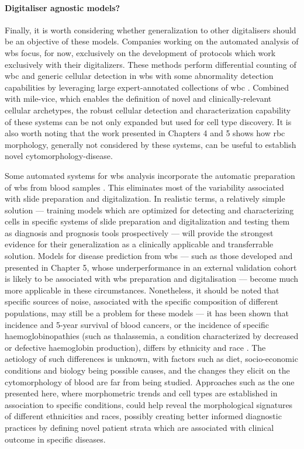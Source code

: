 \paragraph{Digitaliser agnostic models?} Finally, it is worth considering whether generalization to other digitalisers should be an objective of these models. Companies working on the automated analysis of \ac{wbs} focus, for now, exclusively on the development of protocols which work exclusively with their digitalizers. These methods perform differential counting of \ac{wbc} and generic cellular detection in \ac{wbs} with some abnormality detection capabilities by leveraging large expert-annotated collections of \ac{wbc} \cite{cellavision,advia-120}. Combined with \ac{mile-vice}, which enables the definition of novel and clinically-relevant cellular archetypes, the robust cellular detection and characterization capability of these systems can be not only expanded but used for cell type discovery. It is also worth noting that the work presented in Chapters 4 and 5 shows how \ac{rbc} morphology, generally not considered by these systems, can be useful to establish novel cytomorphology-disease. 

Some automated systems for \ac{wbs} analysis incorporate the automatic preparation of \ac{wbs} from blood samples \cite{advia-120}. This eliminates most of the variability associated with slide preparation and digitalization. In realistic terms, a relatively simple solution --- training models which are optimized for detecting and characterizing cells in specific systems of slide preparation and digitalization and testing them as diagnosis and prognosis tools prospectively --- will provide the strongest evidence for their generalization as a clinically applicable and transferrable solution. Models for disease prediction from \ac{wbs} --- such as those developed and presented in Chapter 5, whose underperformance in an external validation cohort is likely to be associated with \ac{wbs} preparation and digitalisation --- become much more applicable in these circumstances. Nonetheless, it should be noted that specific sources of noise, associated with the specific composition of different populations, may still be a problem for these models --- it has been shown that incidence and 5-year survival of blood cancers, or the incidence of specific haemoglobinopathies (such as thalassemia, a condition characterized by decreased or defective haemoglobin production), differs by ethnicity and race \cite{Kirtane2017-dh,Lorey1996-yc}. The aetiology of such differences is unknown, with factors such as diet, socio-economic conditions and biology being possible causes, and the changes they elicit on the cytomorphology of blood are far from being studied. Approaches such as the one presented here, where morphometric trends and cell types are established in association to specific conditions, could help reveal the morphological signatures of different ethnicities and races, possibly creating better informed diagnostic practices by defining novel patient strata which are associated with clinical outcome in specific diseases.
